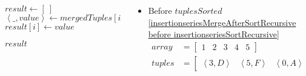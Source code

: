 \begin{frame}[containsverbatim]{\insertionseriesexampleframe}
\begin{columns}[c]
\begin{column}{0.45\textwidth}
{\begin{minipage}[c]{\textwidth}
\begin{algorithm}[H]
\begin{algorithmic}[1]
                                            \State $result \gets \left[\ \right]$
                                                \State $\left<\_, value\right> \gets mergedTuples{\left[i\right]}$
                                                \State $result{\left[i\right]} \gets value$
                                            \EndFor
                        
                                            \State \Return $result$
                                        \EndFunction
                                    \end{algorithmic}
                                \end{algorithm}
                            \endgroup
                        \end{minipage}
                    }
                \end{column}

                \begin{column}{0.55\textwidth}
                    \begin{itemize}
                        \item Before $tuplesSorted$ \cref{insertionseriesMergeAfterSortRecursive before insertionseriesSortRecursive}
                        \begin{align*}
                            array & = \begin{bmatrix}1 & 2 & 3 & 4 & 5\end{bmatrix} \\
                            tuples & = \begin{bmatrix}\left<3, D\right> & \left<5, F\right> & \left<0, A\right> & \left<8, I\right>\end{bmatrix}
                        \end{align*}
                    \end{itemize}
                \end{column}
            \end{columns}
        \end{frame}


